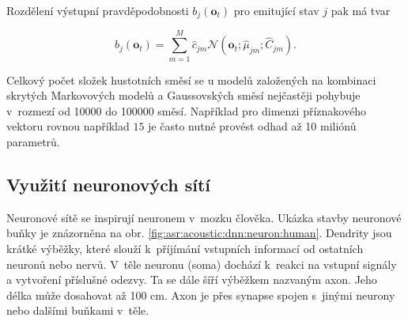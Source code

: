 


\noindent Rozdělení výstupní pravděpodobnosti $b_j\left(\boldsymbol{o}_t\right)$ pro emitující stav $j$ pak má tvar

\begin{equation}
   b_{j}\left(\boldsymbol{o}_t\right) = \sum_{m=1}^{M} \hat{c}_{jm} \mathcal{N}\left(\boldsymbol{o}_t; \hat{\mu}_{jm}; \hat{C}_{jm}\right).
   \label{eq:asr:acoustic:gmm:output}
 \end{equation}

\noindent Celkový počet složek hustotních směsí se u modelů založených na kombinaci skrytých Markovových modelů a Gaussovských směsí nejčastěji pohybuje v~rozmezí od 10000 do 100000 směsí. Například pro dimenzi příznakového vektoru rovnou například $15$ je často nutné provést odhad až 10 miliónů parametrů.

\subsection{Využití neuronových sítí}
\label{chap:asr:acoustic:DNN}

Neuronové sítě se inspirují neuronem v~mozku člověka. Ukázka stavby neuronové buňky je znázorněna na obr. \ref{fig:asr:acoustic:dnn:neuron:human}. Dendrity jsou krátké výběžky, které slouží  k~příjímání vstupních informací od ostatních neuronů nebo nervů. V~těle neuronu (soma) dochází  k~reakci na vstupní signály a vytvoření příslušné odezvy. Ta se dále šíří výběžkem nazvaným axon. Jeho délka může dosahovat až 100 cm. Axon je přes synapse spojen s~jinými neurony nebo dalšími buňkami v~těle.

